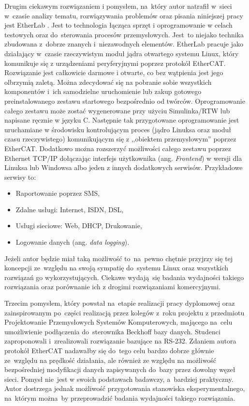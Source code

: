 Drugim ciekawym rozwiązaniem i pomysłem, na~który autor natrafił w~sieci w~czasie analizy tematu, rozwiązywania problemów oraz pisania niniejszej pracy jest EtherLab \cite{etherlab, ETG_etherlab}. Jest to technologia łącząca sprzęt i oprogramowanie w celach testowych oraz do~sterowania procesów przemysłowych. Jest~to niejako technika zbudowana z~dobrze znanych i~niezawodnych elementów.
EtherLab pracuje jako działający w~czasie rzeczywistym moduł jądra otwartego systemu Linux, który komunikuje się z urządzeniami peryferyjnymi poprzez protokół EtherCAT. Rozwiązanie jest całkowicie darmowe i otwarte, co bez wątpienia jest jego olbrzymią zaletą. Można zdecydować się na pobranie sobie wszystkich komponentów i~ich samodzielne uruchomienie lub zakup gotowego preinstalowanego zestawu startowego bezpośrednio od twórców. 
Oprogramowanie całego zestawu może zostać wygenerowane przy użyciu Simulinka/RTW lub napisane ręcznie w języku C. Następnie tak przygotowane oprogramowanie jest uruchamiane w środowisku kontrolującym proces (jądro Linuksa oraz moduł czasu rzeczywistego) komunikującym się z ,,obiektem przemysłowym'' poprzez EtherCAT. Dodatkowo można rozszerzyć możliwości całego zestawu poprzez Ethernet TCP/IP dołączając interfejs użytkownika (ang. \textit{Frontend}) w wersji dla Linuksa lub Windowsa albo jeden z innych dodatkowych serwisów. Przykładowe serwisy to:
\begin{itemize}
\item Raportowanie poprzez SMS,
\item Zdalne usługi: Internet, ISDN, DSL,
\item Usługi sieciowe: Web, DHCP, Drukowanie,
\item Logowanie danych (ang. \textit{data logging}).
\end{itemize}
Jeżeli autor będzie miał taką możliwość to~na~pewno chętnie przyjrzy się tej koncepcji ze~względu na swoją sympatię do~systemu Linux oraz wszystkich rozwiązań go wykorzystujących. Ciekawe wydają~się badania wydajności takiego rozwiązania oraz porównanie ich z drogimi rozwiązaniami komercyjnymi.

Trzecim pomysłem, który powstał na~etapie realizacji pracy dyplomowej oraz zainspirowanym po~części realizacją przez kolegów z~roku projektu z przedmiotu Projektowanie Przemysłowych Systemów Komputerowych, mającego na~celu umożliwienie podłączenia do~sterownika Beckhoff bazy danych. Studenci zaproponowali i~zrealizowali rozwiązanie bazujące na RS-232. Zdaniem autora protokół EtherCAT nadawałby się do~tego celu bardzo dobrze głównie ze~względu na prędkość działania, ale również ze względu na możliwość bezpośredniej modyfikacji danych zapisywanych do~bazy przez dowolny węzeł sieci. Pomysł nie~jest w swoich podstawach badawczy, a~bardziej praktyczny. Autor dostrzega jednak możliwość przygotowania stanowiska eksperymentalnego, na~którym można~by przeprowadzić badania wydajności takiego rozwiązania.

